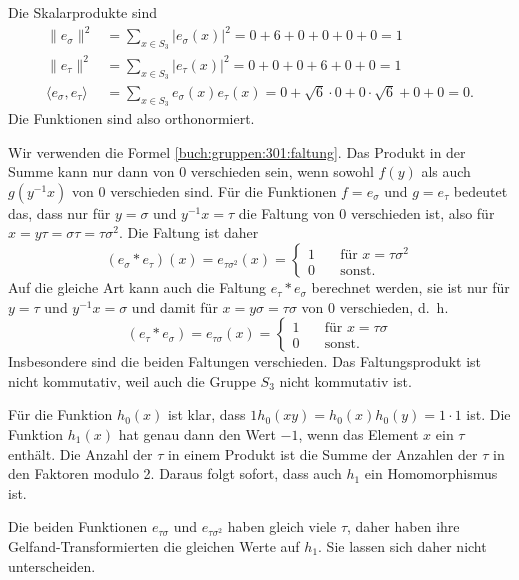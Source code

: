 \begin{loesung}
\begin{teilaufgaben}
\item
Die Skalarprodukte sind
\begin{align*}
\|e_\sigma\|^2
&=
\sum_{x\in S_3} |e_\sigma(x)|^2
=
0+6+0+0+0+0 =1\\
\|e_\tau\|^2
&=
\sum_{x\in S_3} |e_\tau(x)|^2
=
0+0+0+6+0+0 =1\\
\langle e_\sigma,e_\tau\rangle
&=
\sum_{x\in S_3} e_\sigma(x)e_\tau(x)
=
0+\!\sqrt{6}\cdot 0+0\cdot\!\sqrt{6}+0+0 = 0.
\end{align*}
Die Funktionen sind also orthonormiert.
\item
Wir verwenden die Formel \eqref{buch:gruppen:301:faltung}.
Das Produkt in der Summe kann nur dann von $0$ verschieden sein,
wenn sowohl $f(y)$ als auch $g(y^{-1}x)$ von $0$ verschieden sind.
Für die Funktionen $f=e_\sigma$ und $g=e_\tau$ bedeutet das, dass
nur für $y=\sigma$ und $y^{-1}x=\tau$ die Faltung von $0$ verschieden 
ist, also für $x=y\tau=\sigma\tau=\tau\sigma^2$.
Die Faltung ist daher
\[
(e_\sigma*e_\tau)(x)
=
e_{\tau\sigma^2}(x)
=
\begin{cases}
1&\quad\text{für $x=\tau\sigma^2$}\\
0&\quad\text{sonst.}
\end{cases}
\]
Auf die gleiche Art kann auch die Faltung $e_\tau*e_\sigma$ berechnet
werden, sie ist nur für $y=\tau$ und $y^{-1}x=\sigma$ und damit
für $x=y\sigma=\tau\sigma$ von $0$ verschieden, d.~h.
\[
(e_\tau * e_\sigma)
=
e_{\tau\sigma}(x)
=
\begin{cases}
1&\quad\text{für $x=\tau\sigma$}\\
0&\quad\text{sonst.}
\end{cases}
\]
Insbesondere sind die beiden Faltungen verschieden.
Das Faltungsprodukt ist nicht kommutativ, weil auch die Gruppe
$S_3$ nicht kommutativ ist.
\item
Für die Funktion $h_0(x)$ ist klar, dass
$1h_0(xy)=h_0(x)h_0(y)=1\cdot1$ ist.
Die Funktion $h_1(x)$ hat genau dann den Wert $-1$, wenn das
Element $x$ ein $\tau$ enthält.
Die Anzahl der $\tau$ in einem Produkt ist die Summe
der Anzahlen der $\tau$ in den Faktoren modulo 2.
Daraus folgt sofort, dass auch $h_1$ ein Homomorphismus ist.
\item
Die beiden Funktionen $e_{\tau\sigma}$ und $e_{\tau\sigma^2}$ 
haben gleich viele $\tau$, daher haben ihre Gelfand-Transfor\-mierten
die gleichen Werte auf $h_1$.
Sie lassen sich daher nicht unterscheiden.
\item

\end{teilaufgaben}
\end{loesung}
